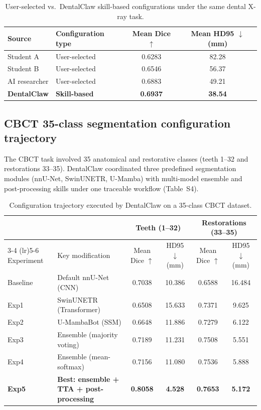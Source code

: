\documentclass[11pt]{article}
\begin{document}
\begin{table}[!ht]
\centering
\small
\caption{User-selected vs.\ DentalClaw skill-based configurations under the same dental X-ray task.}
\label{tab:supp_user_comparison}
\begin{tabular}{l l c c}
\toprule
Source & Configuration type & Mean Dice $\uparrow$ & Mean HD95 $\downarrow$ (mm) \\
\midrule
Student A & User-selected & 0.6283 & 82.28 \\
Student B & User-selected & 0.6546 & 56.37 \\
AI researcher & User-selected & 0.6883 & 49.21 \\
\textbf{DentalClaw} & \textbf{Skill-based} & \textbf{0.6937} & \textbf{38.54} \\
\bottomrule
\end{tabular}
\end{table}

\subsection{CBCT 35-class segmentation configuration trajectory}

The CBCT task involved 35 anatomical and restorative classes (teeth 1--32 and restorations 33--35). DentalClaw coordinated three predefined segmentation modules (nnU-Net, SwinUNETR, U-Mamba) with multi-model ensemble and post-processing skills under one traceable workflow (Table~S4).

\begin{table}[!ht]
\centering
\small
\caption{Configuration trajectory executed by DentalClaw on a 35-class CBCT dataset.}
\label{tab:supp_cbct_trajectory}
\begin{tabular}{l l c c c c}
\toprule
& & \multicolumn{2}{c}{Teeth (1--32)} & \multicolumn{2}{c}{Restorations (33--35)} \\
\cmidrule(lr){3-4} \cmidrule(lr){5-6}
Experiment & Key modification & Mean Dice $\uparrow$ & HD95 $\downarrow$ (mm) & Mean Dice $\uparrow$ & HD95 $\downarrow$ (mm) \\
\midrule
Baseline & Default nnU-Net (CNN) & 0.7038 & 10.386 & 0.6588 & 16.484 \\
Exp1 & SwinUNETR (Transformer) & 0.6508 & 15.633 & 0.7371 & 9.625 \\
Exp2 & U-MambaBot (SSM) & 0.6648 & 11.886 & 0.7279 & 6.122 \\
Exp3 & Ensemble (majority voting) & 0.7189 & 11.231 & 0.7508 & 5.551 \\
Exp4 & Ensemble (mean-softmax) & 0.7156 & 11.080 & 0.7536 & 5.888 \\
\textbf{Exp5} & \textbf{Best: ensemble + TTA + post-processing} & \textbf{0.8058} & \textbf{4.528} & \textbf{0.7653} & \textbf{5.172} \\
\bottomrule
\end{tabular}
\end{table}
\end{document}
